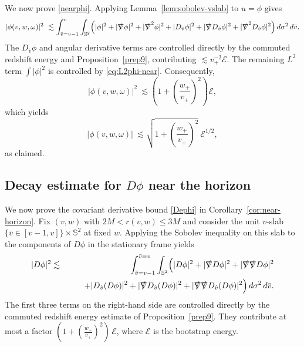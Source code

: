 \documentclass[11pt]{article}
\numberwithin{equation}{section}
\theoremstyle{plain}
\theoremstyle{definition}
\theoremstyle{remark}
\newcommand{\vplus}{v_{+}}
\newcommand{\wplus}{w_{+}}
\begin{document}
We now prove \eqref{nearphi}.
Applying Lemma~\ref{lem:sobolev-vslab} to $u=\phi$ gives
\begin{equation}
|\phi(v,w,\omega)|^{2}
\ \lesssim
\int_{\bar v=v-1}^{v}\int_{\mathbb S^{2}}
\Bigl(
|\phi|^{2}+|\slashed{\nabla}\phi|^{2}+|\slashed{\nabla}^{2}\phi|^{2}
+|D_{\hat v}\phi|^{2}+|\slashed{\nabla}D_{\hat v}\phi|^{2}+|\slashed{\nabla}^{2}D_{\hat v}\phi|^{2}
\Bigr)\,d\sigma^{2}\,d\bar v.
\end{equation}
The $D_{\hat v}\phi$ and angular derivative terms are controlled directly by the commuted redshift energy and Proposition~\ref{prep9}, contributing $\lesssim \vplus^{-2}\mathcal E$.
The remaining $L^{2}$ term $\int|\phi|^{2}$ is controlled by \eqref{eq:L2phi-near}.
Consequently,
\begin{equation}
|\phi(v,w,\omega)|^{2}
\ \lesssim
\left(1+\left(\frac{\wplus}{\vplus}\right)^{2}\right)\mathcal{E},
\end{equation}
which yields
\begin{equation}
|\phi(v,w,\omega)|
\ \lesssim
\sqrt{1+\left(\frac{\wplus}{\vplus}\right)^{2}}\ \mathcal{E}^{1/2},
\end{equation}
as claimed.

\subsection{Decay estimate for \texorpdfstring{$D\phi$}{} near the horizon}\label{subsec:decay-Dphi-near}

We now prove the covariant derivative bound \eqref{Dephi} in Corollary~\ref{cor:near-horizon}.
Fix $(v,w)$ with $2M<r(v,w)\le 3M$ and consider the unit $v$-slab
$\{\bar v\in[v-1,v]\}\times\mathbb S^{2}$ at fixed $w$.
Applying the Sobolev inequality on this slab to the components of $D\phi$ in the stationary frame yields
\begin{eqnarray}\label{eq:sobolev-Dphi-near}
|D\phi|^{2}
&\lesssim&
\int_{\bar{v}=v-1}^{\bar{v}=v}\int_{\mathbb S^{2}}
\Bigl(
|D\phi|^{2}
+|\slashed{\nabla}D\phi|^{2}
+|\slashed{\nabla}\slashed{\nabla}D\phi|^{2}
\nonumber\\
&&\qquad
+|D_{\hat v}(D\phi)|^{2}
+|\slashed{\nabla}D_{\hat v}(D\phi)|^{2}
+|\slashed{\nabla}\slashed{\nabla}D_{\hat v}(D\phi)|^{2}
\Bigr)\,d\sigma^{2}\,d\bar v.
\end{eqnarray}
The first three terms on the right-hand side are controlled directly by the commuted redshift energy estimate of Proposition~\ref{prep9}.
They contribute at most a factor $(1+(\frac{\wplus}{\vplus})^{2})\,\mathcal{E}$, where $\mathcal{E}$ is the bootstrap energy.
\end{document}
